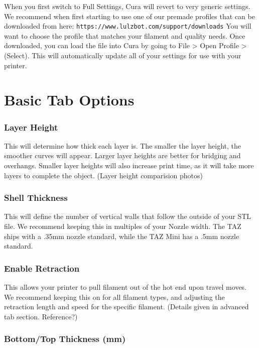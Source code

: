 When you first switch to Full Settings, Cura will revert to very generic settings. We recommend when first starting to use one of our premade profiles that can be downloaded from here: \texttt{https://www.lulzbot.com/support/downloads} You will want to choose the profile that matches your filament and quality needs. Once downloaded, you can load the file into Cura by going to File > Open Profile > (Select). This will automatically update all of your settings for use with your printer.

\section{Basic Tab Options}

\subsubsection{Layer Height}

This will determine how thick each layer is. The smaller the layer height, the smoother curves will appear. Larger layer heights are better for bridging and overhangs. Smaller layer heights will also increase print time, as it will take more layers to complete the object. (Layer height comparision photos)

\subsubsection{Shell Thickness}

This will define the number of vertical walls that follow the outside of your STL file. We recommend keeping this in multiples of your Nozzle width. The TAZ ships with a .35mm nozzle standard, while the TAZ Mini has a .5mm nozzle standard.

\subsubsection{Enable Retraction}

This allows your printer to pull filament out of the hot end upon travel moves. We recommend keeping this on for all filament types, and adjusting the retraction length and speed for the specific filament. (Details given in advanced tab section. Reference?)

\subsubsection{Bottom/Top Thickness (mm)}

